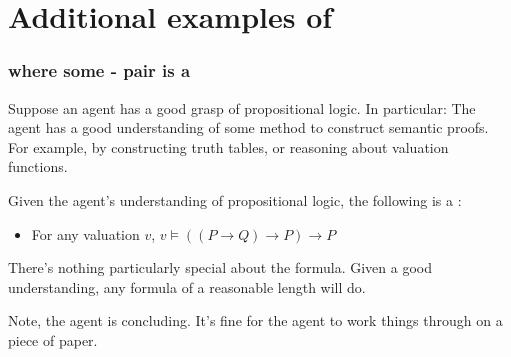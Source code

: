 \chapter{Additional examples of }
\label{cha:addit-exampl-fcs1}

\subsection{ where some - pair is a \fc{}}

\begin{note}
  \begin{scenario}
    \label{illu:sketch:prop-logic}
    Suppose an agent has a good grasp of propositional logic.
    In particular:
    The agent has a good understanding of some method to construct semantic proofs.
    For example, by constructing truth tables, or reasoning about valuation functions.
  \end{scenario}

  Given the agent's understanding of propositional logic, the following is a \fc{}:
  \begin{itemize}
  \item
    For any valuation \(v\), \(v \vDash ((P \rightarrow Q) \rightarrow P) \rightarrow P \)
  \end{itemize}

  There's nothing particularly special about the formula.
  Given a good understanding, any formula of a reasonable length will do.

  Note, the agent is concluding.
  It's fine for the agent to work things through on a piece of paper.
\end{note}



